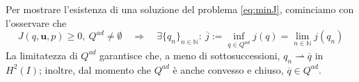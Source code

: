 \documentclass[a4paper,11pt,twoside]{article}
\newcommand{\Q}{Q^{ad}}
\newcommand{\weak}{\rightharpoonup}
\theoremstyle{plain}
\newtheorem{lemma}[teor]{Lemma}
\theoremstyle{definition}
\theoremstyle{remark}
\begin{document}
Per mostrare l'esistenza di una soluzione del problema \eqref{eq:minJ}, cominciamo con l'osservare che
$$J(q,\mathbf{u},p)\geq 0,\ Q^{ad}\neq\emptyset\quad\Rightarrow\quad \exists \{q_n\}_{n\in\mathds{N}} :\ \overline{j}:=\inf_{q\in Q^{ad}}j(q) = \lim_{n\in\mathds{N}}j(q_n)$$
La limitatezza di $\Q$ garantisce che, a meno di sottosuccessioni, $q_n\weak \overline{q}$ in $H^2(I)$; inoltre, dal momento che $\Q$ è anche convesso e chiuso, $\overline{q}\in\Q$.\\
\end{document}
